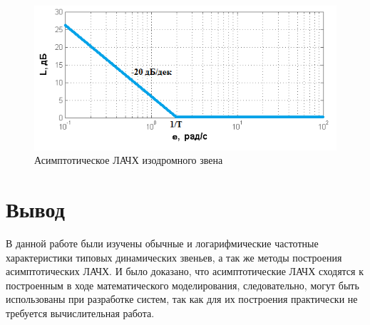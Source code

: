 \documentclass[a4paper, 11pt, russian]{article}
\newcommand{\jj}{\righthyphenmin=20 \justifying}
\begin{document}
    \begin{figure}[ht!]
        \centering
        \includegraphics[scale = 0.8]{isodromusLinkAsymp}
        \caption{Асимптотическое ЛАЧХ изодромного звена}
    \end{figure}
    \clearpage
    \section*{Вывод} \jj
    В данной работе были изучены обычные и логарифмические частотные характеристики типовых динамических звеньев, а так же методы построения асимптотических ЛАЧХ. И было доказано, что асимптотические ЛАЧХ сходятся к построенным в ходе математического моделирования, следовательно, могут быть использованы при разработке систем, так как для их построения практически не требуется вычислительная работа.
\end{document}
